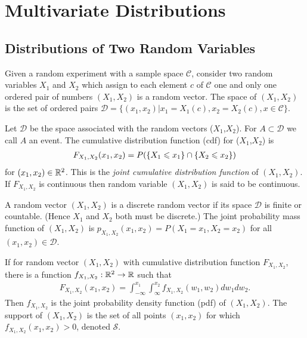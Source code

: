\chapter{Multivariate Distributions}

\section{Distributions of Two Random Variables}

\begin{definition}{}{}
    Given a random experiment with a sample space $\mathcal{C}$,
    consider two random variables $X_1$ and $X_2$ which assign to each element $c$
    of $\mathcal{C}$ one and only one ordered pair of numbers $(X_1,X_2)$ is a random vector.
    The space of $(X_1,X_2)$ is the set of ordered pairs $\mathcal{D}=\{(x_1,x_2)|x_1=X_1(c),x_2=X_2(c),x\in\mathcal{C}\}$.
\end{definition}

\begin{definition}{}{}
    Let $\mathcal{D}$ be the space 
    associated with the random vectors ($X_1$,$X_2$).
    For $A\subset \mathcal{D}$ we call $A$ an event.
    The cumulative distribution function (cdf) for ($X_1$,$X_2$) is 
    \begin{align}
        F_{X_1,X_2}(x_1,x_2)=P(\{X_1\leqslant x_1\}\cap \{X_2\leqslant x_2\})
    \end{align}
    for $(x_1,x_2)\in \mathbb{R}^2$. This is the \textit{joint cumulative distribution function} of $(X_1,X_2)$.
    If $F_{X_1,X_2}$ is continuous then random variable $(X_1,X_2)$ is said to be continuous.
\end{definition}

\begin{definition}{}{}
    A random vector $(X_1,X_2)$ is a discrete random vector if its space 
    $\mathcal{D}$ is finite or countable. (Hence $X_1$ and $X_2$ both must be discrete.)
    The joint probability mass function of $(X_1,X_2)$ is $p_{X_1,X_2}(x_1,x_2)=P(X_1=x_1,X_2=x_2)$
    for all $(x_1,x_2)\in\mathcal{D}$.
\end{definition}

\begin{definition}{}{}
    If for random vector $(X_1,X_2)$ with cumulative distribution function $F_{X_1,X_2}$,
    there is a function $f_{X_1,X_2}:\mathbb{R}^2\rightarrow \mathbb{R}$ such that 
    \begin{align*}
        F_{X_1,X_2}(x_1,x_2)=\int_{-\infty}^{x_1}\int_{\infty}^{x_2} f_{X_1,X_2}(w_1,w_2)dw_1dw_2.
    \end{align*}
    Then $f_{X_1,X_2}$ is the joint probability density function (pdf) of $(X_1,X_2)$.
    The support of $(X_1,X_2)$ is the set of all points $(x_1,x_2)$ for which $f_{X_1,X_2}(x_1,x_2)>0$,
    denoted $\mathcal{S}$.
\end{definition}

